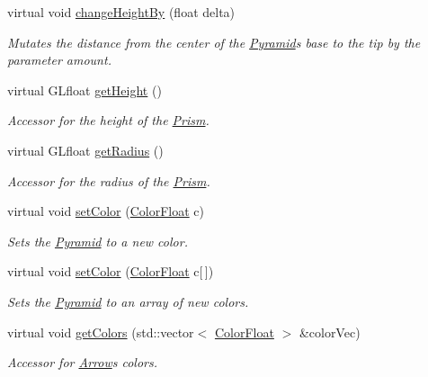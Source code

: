 \begin{DoxyCompactItemize}
virtual void \hyperlink{classtsgl_1_1_pyramid_af7a7b6f5a83b9f6b59a9c6ae0c6812d9}{change\+Height\+By} (float delta)
\begin{DoxyCompactList}\small\item\em Mutates the distance from the center of the \hyperlink{classtsgl_1_1_pyramid}{Pyramid}\textquotesingle{}s base to the tip by the parameter amount. \end{DoxyCompactList}\item 
virtual G\+Lfloat \hyperlink{classtsgl_1_1_pyramid_a4511f7d6a89b061a83dc0fda00ff0c31}{get\+Height} ()
\begin{DoxyCompactList}\small\item\em Accessor for the height of the \hyperlink{classtsgl_1_1_prism}{Prism}. \end{DoxyCompactList}\item 
virtual G\+Lfloat \hyperlink{classtsgl_1_1_pyramid_a778d993a925720d1db6edb17f92dd381}{get\+Radius} ()
\begin{DoxyCompactList}\small\item\em Accessor for the radius of the \hyperlink{classtsgl_1_1_prism}{Prism}. \end{DoxyCompactList}\item 
virtual void \hyperlink{classtsgl_1_1_pyramid_aef16d8830e2dfac0e8a30d091d099c30}{set\+Color} (\hyperlink{structtsgl_1_1_color_float}{Color\+Float} c)
\begin{DoxyCompactList}\small\item\em Sets the \hyperlink{classtsgl_1_1_pyramid}{Pyramid} to a new color. \end{DoxyCompactList}\item 
virtual void \hyperlink{classtsgl_1_1_pyramid_a83799687df3bdef698f9687da7a6c100}{set\+Color} (\hyperlink{structtsgl_1_1_color_float}{Color\+Float} c\mbox{[}$\,$\mbox{]})
\begin{DoxyCompactList}\small\item\em Sets the \hyperlink{classtsgl_1_1_pyramid}{Pyramid} to an array of new colors. \end{DoxyCompactList}\item 
virtual void \hyperlink{classtsgl_1_1_pyramid_a9c93002e90ac1f3385c4d3154ca0321a}{get\+Colors} (std\+::vector$<$ \hyperlink{structtsgl_1_1_color_float}{Color\+Float} $>$ \&color\+Vec)
\begin{DoxyCompactList}\small\item\em Accessor for \hyperlink{classtsgl_1_1_arrow}{Arrow}\textquotesingle{}s colors. \end{DoxyCompactList}\end{DoxyCompactItemize}
